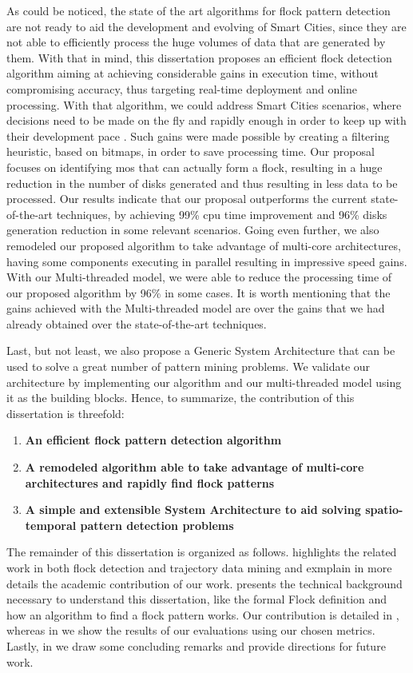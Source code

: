 As could be noticed, the state of the art algorithms for flock pattern detection are not ready to aid the development
and evolving of Smart Cities, since they are not able to efficiently process the huge volumes of data that are generated
by them. With that in mind, this dissertation proposes an efficient flock detection algorithm aiming at achieving
considerable gains in execution time, without compromising accuracy, thus targeting real-time deployment and online
processing. With that algorithm, we could address Smart Cities scenarios, where decisions need to be made on the fly and
rapidly enough in order to keep up with their development pace \citep{ieeesmartcities}\citep{springersmartcities}. Such
gains were made possible by creating a filtering heuristic, based on bitmaps, in order to save processing time. Our
proposal focuses on identifying \acp{mo} that can actually form a flock, resulting in a huge reduction
in the number of disks generated and thus resulting in less data to be processed. Our results indicate that our proposal
outperforms the current state-of-the-art techniques, by achieving 99\% \ac{cpu} time improvement and 96\% disks
generation reduction in some relevant scenarios. Going even further, we also remodeled our proposed algorithm to take
advantage of multi-core architectures, having some components executing in parallel resulting in impressive speed gains.
With our Multi-threaded model, we were able to reduce the processing time of our proposed algorithm by 96\% in some
cases. It is worth mentioning that the gains achieved with the Multi-threaded model are over the gains that we had
already obtained over the state-of-the-art techniques.

Last, but not least, we also propose a Generic System Architecture that can be used to solve a great number of pattern
mining problems. We validate our architecture by implementing our algorithm and our multi-threaded model using it as the
building blocks. Hence, to summarize, the contribution of this dissertation is threefold:

\begin{enumerate}
    \item \textbf{An efficient flock pattern detection algorithm}
    \item \textbf{A remodeled algorithm able to take advantage of multi-core architectures and rapidly find flock
        patterns}
    \item \textbf{A simple and extensible System Architecture to aid solving spatio-temporal pattern detection problems}
\end{enumerate}

The remainder of this dissertation is organized as follows.  highlights the related work in
both flock detection and trajectory data mining and exmplain in more details the academic contribution of our work.
 presents the technical background necessary to understand this dissertation, like the
formal Flock definition and how an algorithm to find a flock pattern works. Our contribution is detailed in
, whereas in  we show the results of our evaluations using our chosen
metrics. Lastly, in  we draw some concluding remarks and provide directions for future work.
